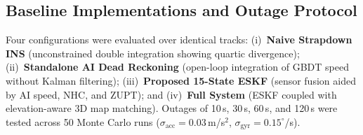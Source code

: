 \documentclass[conference]{IEEEtran}
\begin{document}
\subsection{Baseline Implementations and Outage Protocol}
Four configurations were evaluated over identical tracks: (i)~\textbf{Naive Strapdown INS} \cite{dissanayake2001} (unconstrained double integration showing quartic divergence); (ii)~\textbf{Standalone AI Dead Reckoning} \cite{brossard2020} (open-loop integration of GBDT speed without Kalman filtering); (iii)~\textbf{Proposed 15-State ESKF} (sensor fusion aided by AI speed, NHC, and ZUPT); and (iv)~\textbf{Full System} \cite{newson2009} (ESKF coupled with elevation-aware 3D map matching). Outages of 10\,s, 30\,s, 60\,s, and 120\,s were tested across 50 Monte Carlo runs ($\sigma_{\text{acc}} = 0.03$\,m/s$^2$, $\sigma_{\text{gyr}} = 0.15^\circ$/s).
\end{document}
